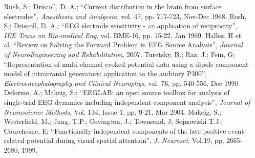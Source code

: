 \documentclass{article}
\begin{document}
\begin{thebibliography}{3}
            Rush, S.; Driscoll, D. A.; ``Current distribution in the brain from surface electrodes'', \emph{Anesthesia and Analgesia}, vol. 47, pp. 717-723, Nov-Dec 1968.
             Rush, S.; Driscoll, D. A.; ``EEG electrode sensitivity - an application of reciprocity'', \emph{IEE Trans on Bio-medical Eng}, vol. BME-16, pp. 15-22, Jan 1969.
            Hallez, H et al. ``Review on Solving the Forward Problem in EEG Source Analysis'', \emph{Journal of NeuroEngineering and Rehabilitation}, 2007.
            Turetsky, B.; Raz, J.; Fein, G; ``Representation of multi-channel evoked potential data using a dipole component model of intracranial generators: application to the auditory P300'', \emph{Electroencephalography and Clinical Neurophys}, vol. 76, pp. 540-556, Dec 1990.
            Delorme, A.; Makeig, S.; ``EEGLAB: an open source toolbox for analysis of single-trial EEG dynamics including independent component analysis'', \emph{Journal of Neuroscience Methods}, Vol. 134, Issue 1, pp. 9-21, Mar 2004.
        Makeig, S.; Westerfield, M.; Jung, T.P.; Covington, J.; Townsend, J; Sejnowiski T.J.; Courchesne, E; ``Functionally independent components of the late positive event-related potential during visual spatial attention'', \emph{J. Neurosci}, Vol.19, pp. 2665-2680, 1999.

\end{thebibliography}
\end{document}
